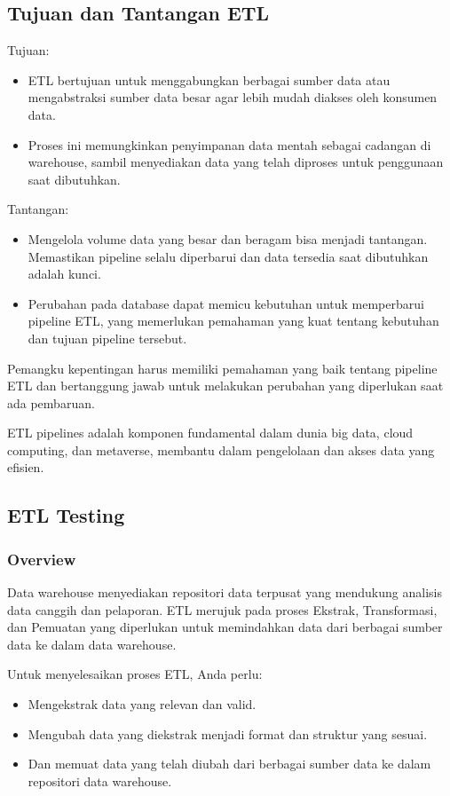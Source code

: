 \documentclass{article}
\begin{document}
\subsection{Tujuan dan Tantangan ETL}
Tujuan:
\begin{itemize}
    \item ETL bertujuan untuk menggabungkan berbagai sumber data atau mengabstraksi sumber data besar agar lebih mudah diakses oleh konsumen data.
    \item Proses ini memungkinkan penyimpanan data mentah sebagai cadangan di warehouse, sambil menyediakan data yang telah diproses untuk penggunaan saat dibutuhkan.
\end{itemize}
Tantangan:
\begin{itemize}
    \item Mengelola volume data yang besar dan beragam bisa menjadi tantangan. Memastikan pipeline selalu diperbarui dan data tersedia saat dibutuhkan adalah kunci.
    \item Perubahan pada database dapat memicu kebutuhan untuk memperbarui pipeline ETL, yang memerlukan pemahaman yang kuat tentang kebutuhan dan tujuan pipeline tersebut.
\end{itemize}

Pemangku kepentingan harus memiliki pemahaman yang baik tentang pipeline ETL dan bertanggung jawab untuk melakukan perubahan yang diperlukan saat ada pembaruan.

ETL pipelines adalah komponen fundamental dalam dunia big data, cloud computing, dan metaverse, membantu dalam pengelolaan dan akses data yang efisien.

\subsection{ETL Testing}
\subsubsection{Overview}
Data warehouse menyediakan repositori data terpusat yang mendukung analisis data canggih dan pelaporan. ETL merujuk pada proses Ekstrak, Transformasi, dan Pemuatan yang diperlukan untuk memindahkan data dari berbagai sumber data ke dalam data warehouse.

Untuk menyelesaikan proses ETL, Anda perlu:
\begin{itemize}
    \item Mengekstrak data yang relevan dan valid.
    \item Mengubah data yang diekstrak menjadi format dan struktur yang sesuai.
    \item Dan memuat data yang telah diubah dari berbagai sumber data ke dalam repositori data warehouse.
\end{itemize}
\end{document}

